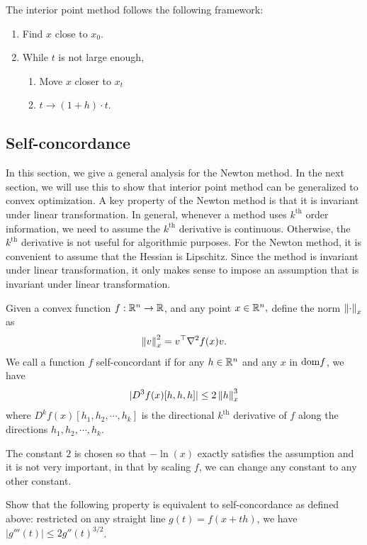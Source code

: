 The interior point method follows the following framework:
\begin{enumerate}
\item Find $x$ close to $x_{0}$.
\item While $t$ is not large enough,
\begin{enumerate}
\item Move $x$ closer to $x_{t}$
\item $t\rightarrow(1+h)\cdot t$.
\end{enumerate}
\end{enumerate}

\subsection{Self-concordance}

In this section, we give a general analysis for the Newton method.
In the next section, we will use this to show that interior point
method can be generalized to convex optimization. A key property of
the Newton method is that it is invariant under linear transformation.
In general, whenever a method uses $k^{\mathrm{th}}$ order information,
we need to assume the $k^{\mathrm{th}}$ derivative is continuous.
Otherwise, the $k^{\mathrm{th}}$ derivative is not useful for algorithmic
purposes. For the Newton method, it is convenient to assume that the
Hessian is Lipschitz. Since the method is invariant under linear transformation,
it only makes sense to impose an assumption that is invariant under
linear transformation.
\begin{defn}
Given a convex function $f:\mathbb{R}^{n}\rightarrow\mathbb{R}$, and any point $x\in\mathbb{R}^{n},$
define the norm $\left\Vert \cdot\right\Vert_{x}$ as 
\[
\left\Vert v\right\Vert^{2}_{x}=v^{\top}\nabla^{2}f(x)v.
\]
We call a function $f$ self-concordant if for any $h\in\mathbb{R}^{n}$ and
any $x$ in $\mathrm{dom} f$, we have
\[
|D^{3}f(x)[h,h,h]|\leq2\left\Vert h\right\Vert^{3}_{x}
\]
where $D^{k}f(x)[h_{1},h_{2},\cdots,h_{k}]$ is the directional $k^{\mathrm{th}}$
derivative of $f$ along the directions $h_{1},h_{2},\cdots,h_{k}$.
\end{defn}

\begin{rem*}
The constant $2$ is chosen so that $-\ln(x)$ exactly satisfies the
assumption and it is not very important, in that by scaling $f$,
we can change any constant to any other constant.
\end{rem*}
\begin{xca}
Show that the following property is equivalent to self-concordance
as defined above: restricted on any straight line $g(t)=f(x+th)$,
we have $|g'''(t)|\leq2g''(t)^{3/2}$.
\end{xca}

